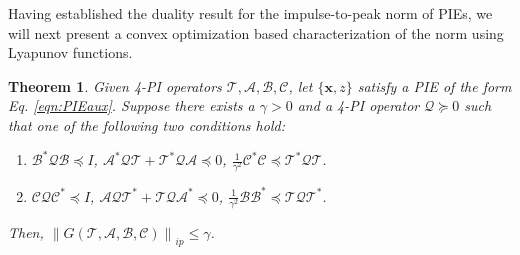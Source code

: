 \documentclass[letterpaper, 10 pt, conference]{ieeeconf}
\newcommand{\mcl}[1]{\mathcal{#1}}
\newcommand{\mbf}[1]{\mathbf{#1}}
\newcommand{\norm}[1]{\left\lVert #1 \right\rVert}
\newtheorem{theorem}{Theorem} %
\theoremstyle{definition}
\begin{document}
Having established the duality result for the impulse-to-peak norm of PIEs, we will next present a convex optimization based characterization of the norm using Lyapunov functions. 
\begin{theorem}\label{thm:Normcoercive}
    Given 4-PI operators ${\mathcal{T},\mathcal{A},\mathcal{B},\mathcal{C}}$, let $\{\mbf x, z\}$ satisfy a PIE of the form
    Eq. \eqref{eqn:PIEaux}. Suppose there exists a $\gamma>0$ and a 4-PI operator $\mcl Q \succeq 0$ such that one of the following two conditions hold:
    \begin{enumerate}[leftmargin=*]
        \item[(i)] $\mathcal{B}^*\mcl Q\mathcal{B}\preceq I$, $\mathcal{A}^*\mcl Q\mathcal{T}+\mathcal{T}^*\mcl Q\mathcal{A} \preceq 0$, $\frac{1}{\gamma^2}\mathcal{C}^*\mathcal{C} \preceq \mathcal{T}^*\mcl Q\mathcal{T}$.
        \item[(ii)] $\mathcal{C}\mcl Q\mathcal{C}^*\preceq I$, $\mathcal{A}\mcl Q\mathcal{T}^*+\mathcal{T}\mcl Q\mathcal{A}^* \preceq 0$, $\frac{1}{\gamma^2}\mathcal{B}\mathcal{B}^* \preceq \mathcal{T}\mcl Q\mathcal{T}^*$.
    \end{enumerate} 
    Then, $\norm{G(\mcl T, \mcl A,\mcl B,\mcl C)}_{ip} \le \gamma$.
\end{theorem}
\end{document}
